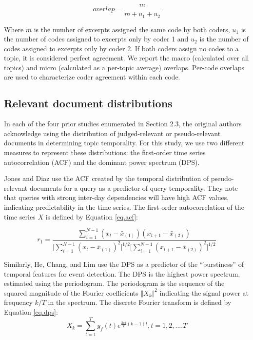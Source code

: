 \documentclass{sig-alternate}
\begin{document}
\[
overlap = \frac{m}{m + u_1 + u_2} 
\]

Where $m$ is the number of excerpts assigned the same code by both coders, $u_1$ is the number of codes assigned to excerpts only by coder 1 and $u_2$ is the number of codes assigned to excerpts only by coder 2. If both coders assign no codes to a topic, it is considered perfect agreement. We report the macro (calculated over all topics) and micro (calculated as a per-topic average) overlaps.  Per-code overlaps are used to characterize coder agreement within each code.

\subsection{Relevant document distributions}

In each of the four prior studies enumerated in Section 2.3, the original authors acknowledge using the distribution of judged-relevant or pseudo-relevant documents in determining topic temporality. For this study, we use two different measures to represent these distributions: the first-order time series autocorrelation (ACF) and the dominant power spectrum (DPS).

Jones and Diaz \cite{Jones2007} use the ACF created by the temporal distribution of pseudo-relevant documents for a query as a predictor of query temporality. They note that queries with strong inter-day dependencies will have high ACF values, indicating predictability in the time series. The first-order autocorrelation of the time series $X$ is defined by Equation \ref{eq.acf}:

\begin{equation}
r_1 = \dfrac{\sum_{i=1}^{N-1} (x_t - \bar{x}_{(1)})(x_{t+1} - \bar{x}_{(2)})}{ \big [ \sum_{i=1}^{N-1}  (x_t - \bar{x}_{(1)})^2 \big ] ^{1/2} \big [\sum_{i=1}^{N-1} (x_{t+1} - \bar{x}_{(2)})^2 \big ]^{1/2}}
\label{eq.acf}
\end{equation}

Similarly, He, Chang, and Lim \cite{He2007} use the DPS as a predictor of the ``burstiness'' of temporal features for event detection. The DPS is the highest power spectrum, estimated using the periodogram. The periodogram is the sequence of the squared magnitude of the Fourier coefficients $\Vert X_k \Vert^2$ indicating the signal power at frequency $k/T$ in the spectrum.  The discrete Fourier transform is defined by Equation \ref{eq.dps}:
\begin{equation}
X_k = \sum_{t=1}^T y_f(t)e^{\frac{2\pi i}{T}(k - 1)t}, t=1,2,....T
\label{eq.dps}
\end{equation}
\end{document}
